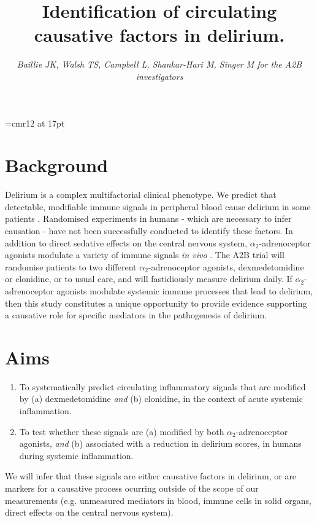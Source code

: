 \documentclass[a4paper,11pt,onecolumn]{IEEEtran}
\newcommand{\ataas}{$\alpha_2$-adrenoceptor agonists\xspace}
\begin{document}

\font\customfont=cmr12 at 17pt
\title{{\customfont Identification of circulating causative factors in delirium.}\vspace{-3ex}}
\author{
	\parbox{\linewidth}{\centering
			\emph{
			Baillie JK, Walsh TS, Campbell L, Shankar-Hari M, Singer M for the A2B investigators
			}
			\vspace{-7ex}
	}
}
\date{}
\maketitle

\section*{Background}
Delirium is a complex multifactorial clinical phenotype. We predict that detectable, modifiable immune signals in peripheral blood cause delirium in some patients%
. Randomised experiments in humans - which are necessary to infer causation - have not been successfully conducted to identify these factors. In addition to direct sedative effects on the central nervous system, \ataas modulate a variety of immune signals \emph{in vivo}%
. The A2B trial will randomise patients to two different \ataas, dexmedetomidine or clonidine, or to usual care, and will fastidiously measure delirium daily. If \ataas modulate systemic immune processes that lead to delirium, then this study constitutes a unique opportunity to provide evidence supporting a causative role for specific mediators in the pathogenesis of delirium.\par

\section*{Aims}
\begin{enumerate}
	\item{To systematically predict circulating inflammatory signals that are modified by (a) dexmedetomidine \emph{and} (b) clonidine, in the context of acute systemic inflammation.}
	\item{To test whether these signals are (a) modified by both \ataas, \emph{and} (b) associated with a reduction in delirium scores, in humans during systemic inflammation.}
\end{enumerate}
We will infer that these signals are either causative factors in delirium, or are markers for a causative process ocurring outside of the scope of our measurements (e.g. unmeasured mediators in blood, immune cells in solid organs, direct effects on the central nervous system).
\end{document}
